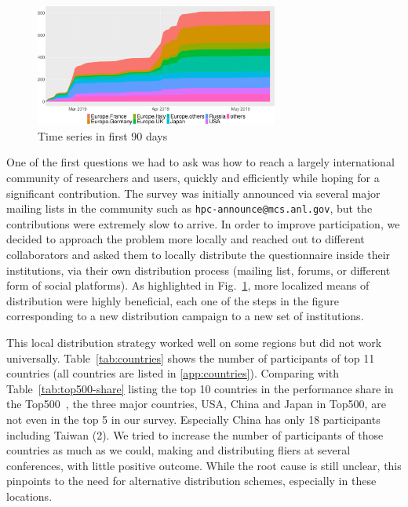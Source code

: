 \documentclass[preprint,5p,times]{elsarticle}
\begin{document}
\begin{figure}[htb]
  \begin{center}
    \includegraphics[width=8.0cm]{R-scripts/TimeSeries.pdf}
    \vspace{-2mm}
    \caption{Time series in first 90 days}
    \label{fig:time-series}
  \end{center}
\end{figure}

One of the first questions we had to ask was how to reach a largely
international community of researchers and users, quickly and
efficiently while hoping for a significant contribution.
%
The survey was initially announced via several major mailing lists in the
community such as {\tt hpc-announce@mcs.anl.gov}, but the contributions were
extremely slow to arrive. In order to improve participation, we decided to
approach the problem more locally and reached out to different collaborators and
asked them to locally distribute the questionnaire inside their institutions,
via their own distribution process (mailing list, forums, or different form of
social platforms). As highlighted in Fig.~\ref{fig:time-series}, more localized
means of distribution were highly beneficial, each one of the steps in the
figure corresponding to a new distribution campaign to a new set of
institutions.


This local distribution strategy worked well on some regions but
did not work universally. Table~\ref{tab:countries} shows the number
of participants of top 11 countries (all countries are listed in
\ref{app:countries}).
Comparing with Table~\ref{tab:top500-share} listing the top 10
countries in the performance share in the Top500~\cite{Top500}, the
three major countries, USA, China and Japan in Top500, are not even in
the top 5 in our survey. Especially China has only 18 participants
including
Taiwan (2). We tried to increase the number of participants of those
countries as much as we could, making and distributing fliers at
several conferences, with little positive outcome. While the root cause is still unclear, this pinpoints to the need for alternative distribution schemes, especially in these locations.
\end{document}
